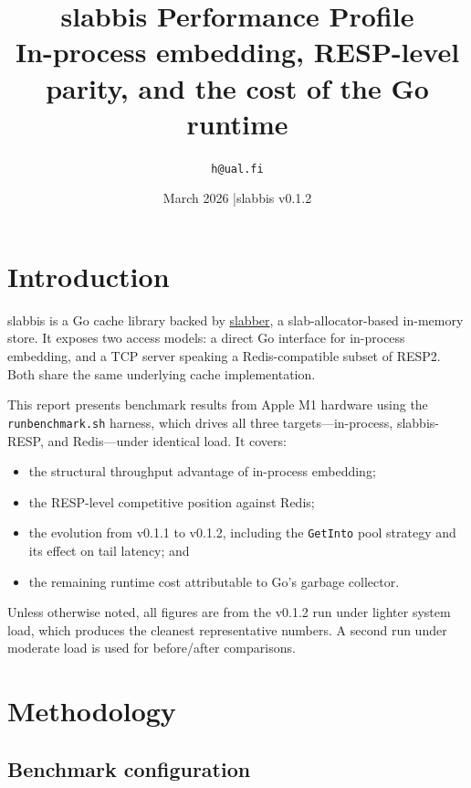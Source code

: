 \documentclass[a4paper,11pt]{article}
\title{%
  \textbf{slabbis Performance Profile}\\[0.4em]
  \large In-process embedding, RESP-level parity, and the cost of the Go runtime
}
\author{\texttt{h@ual.fi}}
\date{March 2026 \quad|\quad slabbis v0.1.2}
\begin{document}
\maketitle
\tableofcontents
\bigskip

\section{Introduction}

slabbis is a Go cache library backed by
\href{https://github.com/ha1tch/slabber}{slabber}, a slab-allocator-based
in-memory store. It exposes two access models: a direct Go interface for
in-process embedding, and a TCP server speaking a Redis-compatible subset of
RESP2. Both share the same underlying cache implementation.

This report presents benchmark results from Apple M1 hardware using the
\texttt{runbenchmark.sh} harness, which drives all three targets---in-process,
slabbis-RESP, and Redis---under identical load. It covers:

\begin{itemize}
  \item the structural throughput advantage of in-process embedding;
  \item the RESP-level competitive position against Redis;
  \item the evolution from v0.1.1 to v0.1.2, including the \texttt{GetInto}
        pool strategy and its effect on tail latency; and
  \item the remaining runtime cost attributable to Go's garbage collector.
\end{itemize}

Unless otherwise noted, all figures are from the v0.1.2 run under lighter
system load, which produces the cleanest representative numbers. A second run
under moderate load is used for before/after comparisons.

\section{Methodology}

\subsection{Benchmark configuration}
\end{document}
